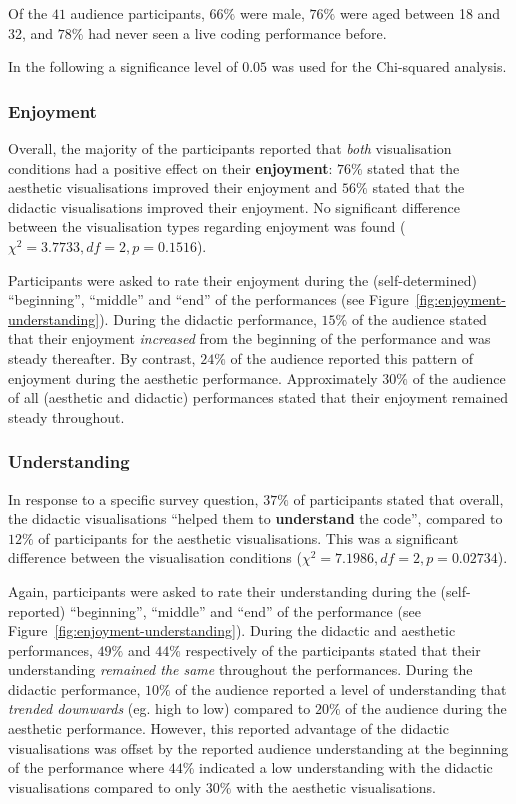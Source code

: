 \documentclass{sig-alternate}
\begin{document}
Of the $41$ audience participants, $66\%$ were male, $76\%$ were aged
between 18 and 32, and $78\%$ had never seen a live coding performance
before.

In the following a significance level of $0.05$ was used for the
Chi-squared analysis.

\subsubsection{Enjoyment}

Overall, the majority of the participants reported that \emph{both}
visualisation conditions had a positive effect on their
\textbf{enjoyment}: $76\%$ stated that the aesthetic visualisations
improved their enjoyment and $56\%$ stated that the didactic
visualisations improved their enjoyment. No significant difference
between the visualisation types regarding enjoyment was found
($\chi^2=3.7733,df=2,p=0.1516$).

Participants were asked to rate their enjoyment during the
(self-determined) ``beginning'', ``middle'' and ``end'' of the
performances (see Figure~\ref{fig:enjoyment-understanding}). During
the didactic performance, $15\%$ of the audience stated that their
enjoyment \emph{increased} from the beginning of the performance and
was steady thereafter. By contrast, $24\%$ of the audience reported
this pattern of enjoyment during the aesthetic performance.
Approximately $30\%$ of the audience of all (aesthetic and didactic)
performances stated that their enjoyment remained steady throughout.

\subsubsection{Understanding}

In response to a specific survey question, $37\%$ of participants
stated that overall, the didactic visualisations ``helped them to
\textbf{understand} the code'', compared to $12\%$ of participants for 
the aesthetic visualisations. This was a significant difference
between the visualisation conditions ($\chi^2=7.1986,df=2,p=0.02734$).

Again, participants were asked to rate their understanding during the
(self-reported) ``beginning'', ``middle'' and ``end'' of the
performance (see Figure~\ref{fig:enjoyment-understanding}). During the
didactic and aesthetic performances, $49\%$ and $44\%$ respectively of
the participants stated that their understanding \emph{remained the
same} throughout the performances. During the didactic performance,
$10\%$ of the audience reported a level of understanding that
\emph{trended downwards} (eg. high to low) compared to $20\%$ of the
audience during the aesthetic performance. However, this reported
advantage of the didactic visualisations was offset by the reported
audience understanding at the beginning of the performance where
$44\%$ indicated a low understanding with the didactic visualisations
compared to only $30\%$ with the aesthetic visualisations.
\end{document}
